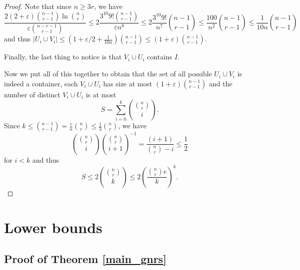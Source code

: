 \documentclass[12pt]{article}
\theoremstyle{remark}
\theoremstyle{definition}
\newcommand{\skob}[1]{\left(#1\right)}
\begin{document}
\begin{proof}
	Note that since $n \geq 3r$, we have 
	$$
		\frac{2(2+\varepsilon)\binom{n-1}{r-1}\ln \binom{n}{r}}{\varepsilon\binom{n-r-1}{r-1}} \leq  2\frac{3^{10} 9!\binom{n-1}{r-1}}{\varepsilon n^8} \leq 2\frac{3^{10}9!}{n^7}\binom{n-1}{r-1} \leq \frac{100}{n^2}\binom{n-1}{r-1} \leq \frac{1}{10n}\binom{n-1}{r-1}
	$$
	and thus $|U_i \cup V_i| \leq \skob{1 + \varepsilon/2 + \frac{1}{10n}}\binom{n-1}{r-1} \leq (1+\varepsilon)\binom{n-1}{r-1}$.
	
	Finally, the last thing to notice is that $V_i \cup U_i$ contains $I$.

	Now we put all of this together to obtain that the set of all possible $U_i \cup V_i$ is indeed a container, each $V_i \cup U_i$ has size at most $(1+\varepsilon)\binom{n-1}{r-1}$ and the number of distinct $V_i \cup U_i$ is at most
	$$
		S = \sum_{i = 0}^{k}\binom{\binom{n}{r}}{i}.
	$$
	Since $k \leq \binom{n-1}{r-1} = \frac{r}{n}\binom{n}{r} \leq \frac{1}{3}\binom{n}{r}$, we have 
	$$
		\binom{\binom{n}{r}}{i} \binom{\binom{n}{r}}{i+1}^{-1} = \frac{(i+1)}{\binom{n}{r}-i} \leq \frac{1}{2}
	$$
	for $i < k$ and thus
	$$
		S \leq 2\binom{\binom{n}{r}}{k} \leq 2\skob{\frac{\binom{n}{r}e}{k}}^{k}.
	$$ 
\end{proof}


\section{Lower bounds}

\subsection{Proof of Theorem \ref{main_gnrs}}
\end{document}

